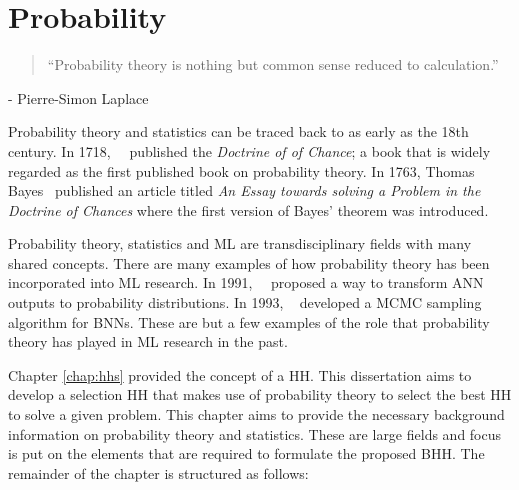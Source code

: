 \chapter{Probability}
\label{chap:probability}

\begin{quotation}
      ``Probability theory is nothing but common sense reduced to calculation.''
\end{quotation}
\begin{flushright}
      - Pierre-Simon Laplace
\end{flushright}

Probability theory and statistics can be traced back to as early as the 18th century. In 1718,~\citeauthor{ref:demoivre:1718}~\cite{ref:demoivre:1718} published the \textit{Doctrine of of Chance}; a book that is widely regarded as the first published book on probability theory. In 1763, Thomas Bayes~\cite{ref:bayes:1763} published an article titled \textit{An Essay towards solving a Problem in the Doctrine of Chances} where the first version of Bayes' theorem was introduced.

Probability theory, statistics and \acf{ML} are transdisciplinary fields with many shared concepts. There are many examples of how probability theory has been incorporated into \acs{ML} research. In 1991,~\citeauthor{ref:denker:1991}~\cite{ref:denker:1991} proposed a way to transform \acf{ANN} outputs to probability distributions. In 1993, \citeauthor{ref:neal:1993}~\cite{ref:neal:1993} developed a \acf{MCMC} sampling algorithm for \acfp{BNN}. These are but a few examples of the role that probability theory has played in \acs{ML} research in the past.

Chapter \ref{chap:hhs} provided the concept of a \acf{HH}. This dissertation aims to develop a selection \acs{HH} that makes use of probability theory to select the best \acs{HH} to solve a given problem. This chapter aims to provide the necessary background information on probability theory and statistics. These are large fields and focus is put on the elements that are required to formulate the proposed \acf{BHH}. The remainder of the chapter is structured as follows:

